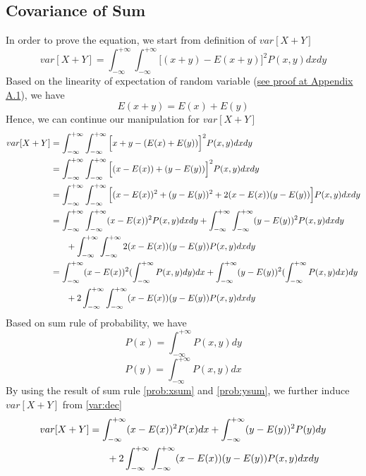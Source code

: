 \documentclass[11pt,a4paper]{article}
\newcommand{\htab}{\hspace*{0.63cm}}
\newcommand{\infint}{\int_{-\infty}^{+\infty}}
\newcommand{\dinfint}{\int_{-\infty}^{+\infty}\int_{-\infty}^{+\infty}}
\begin{document}
\subsection{Covariance of Sum}
\htab In order to prove the equation, we start from definition of $var[X+Y]$
    \begin{equation} \label{var:def}
    var[X+Y] = \dinfint \Big[(x+y)- E(x+y) \Big]^{2} P(x,y) dx dy 
    \end{equation}
\htab Based on the linearity of expectation of random variable (\hyperlink{Linearity}{see proof at Appendix A.1}), we have  
    \begin{equation} \label{exp:lin} E(x+y) = E(x) + E(y) \end{equation}
\htab Hence, we can continue our manipulation for $var[X+Y]$
    \begin{equation} \label{var:dec}
    \begin{aligned}
    var[X+Y] & = \dinfint \Big[x+y- (E(x)+E(y)) \Big]^{2} P(x,y) dx dy \\
             & = \dinfint \Big[ (x-E(x)) + (y -E(y)) \Big]^{2} P(x,y) dx dy \\
    & = \dinfint \Big[ (x-E(x))^{2} + (y-E(y))^{2} + 2(x-E(x))(y-E(y)) \Big] P(x,y) dx dy \\
    & = \dinfint (x-E(x))^{2}P(x,y) dx dy + \dinfint (y-E(y))^{2} P(x,y) dx dy \\ 
    & \htab + \dinfint 2(x-E(x))(y-E(y)) P(x,y) dx dy \\
    & = \infint (x-E(x))^{2} (\infint P(x,y) dy) dx + \infint (y-E(y))^{2} (\infint P(x,y) dx) dy \\
    & \htab + 2\dinfint (x-E(x))(y-E(y)) P(x,y) dx dy 
    \end{aligned}
    \end{equation}
\htab Based on sum rule of probability, we have
    \begin{equation} \label{prob:xsum} P(x) = \infint P(x,y) dy  \end{equation}
    \begin{equation} \label{prob:ysum} P(y) = \infint P(x,y) dx  \end{equation}
\htab By using the result of sum rule \eqref{prob:xsum} and \eqref{prob:ysum}, 
we further induce $var[X+Y]$ from \eqref{var:dec}
    \begin{equation}
    \begin{aligned}
    var[X+Y] & = \infint (x-E(x))^{2} P(x) dx + \infint (y-E(y))^{2} P(y) dy \\
               & \htab + 2\dinfint (x-E(x))(y-E(y)) P(x,y) dx dy \\
    \end{aligned} 
    \end{equation}
\end{document}
